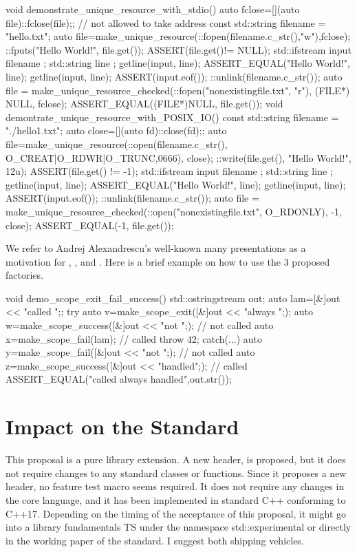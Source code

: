 \documentclass[ebook,11pt,article]{memoir}
\begin{document}
\begin{codeblock}
void demonstrate_unique_resource_with_stdio() {
  auto fclose=[](auto file){::fclose(file);}; // not allowed to take address
  const std::string filename = "hello.txt";
  { auto file=make_unique_resource(::fopen(filename.c_str(),"w"),fclose);
    ::fputs("Hello World!\n", file.get());
    ASSERT(file.get()!= NULL);
  }
  { std::ifstream input { filename };
    std::string line { };
    getline(input, line);
    ASSERT_EQUAL("Hello World!", line);
    getline(input, line);
    ASSERT(input.eof());
  }
  ::unlink(filename.c_str());
  {
    auto file = make_unique_resource_checked(::fopen("nonexistingfile.txt", "r"), 
                (FILE*) NULL, fclose);
    ASSERT_EQUAL((FILE*)NULL, file.get());
  }
}
void demontrate_unique_resource_with_POSIX_IO() {
  const std::string filename = "./hello1.txt";
  auto close=[](auto fd){::close(fd);};
  { auto file=make_unique_resource(::open(filename.c_str(),
                     O_CREAT|O_RDWR|O_TRUNC,0666), close);
    ::write(file.get(), "Hello World!\n", 12u);
    ASSERT(file.get() != -1);
  }
  { std::ifstream input { filename };
    std::string line { };
    getline(input, line);
    ASSERT_EQUAL("Hello World!", line);
    getline(input, line);
    ASSERT(input.eof());
  }
  ::unlink(filename.c_str());
  {
    auto file = make_unique_resource_checked(::open("nonexistingfile.txt", 
                       O_RDONLY), -1, close);
    ASSERT_EQUAL(-1, file.get());
  }
}\end{codeblock}

We refer to Andrej Alexandrescu's well-known many presentations as a motivation for , , and . Here is a brief example on how to use the 3 proposed factories. 
\begin{codeblock}
void demo_scope_exit_fail_success(){
  std::ostringstream out{};
  auto lam=[&]{out << "called ";};
  try{
    auto v=make_scope_exit([&]{out << "always ";});
    auto w=make_scope_success([&]{out << "not ";}); // not called
    auto x=make_scope_fail(lam); // called
    throw 42;
  }catch(...){
    auto y=make_scope_fail([&]{out << "not ";}); // not called
    auto z=make_scope_success([&]{out << "handled";}); // called
  }
  ASSERT_EQUAL("called always handled",out.str());
}
\end{codeblock}


\chapter{Impact on the Standard}
This proposal is a pure library extension. A new header,  is proposed, but it does not require changes to any standard classes or functions. Since it proposes a new header, no feature test macro seems required. It does not require any changes in the core language, and it has been implemented in standard C++ conforming to C++17. Depending on the timing of the acceptance of this proposal, it might go into a library fundamentals TS under the namespace std::experimental or directly in the working paper of the standard. I suggest both shipping vehicles.
\end{document}
